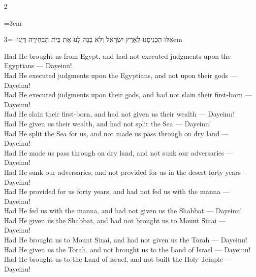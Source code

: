 \documentclass[11pt, openany]{book}
\newenvironment{bilingual}{%
  \par\vspace{4pt}%
  \begin{paracol}{2}%
}{%
  \end{paracol}%
  \par\vspace{2pt}%
}
\newenvironment{hebrewcol}{%
  \switchcolumn[1]%
  \begingroup
  \RTL
  \hebrewfont\large
  \setstretch{1.4}%
  \emergencystretch=3em
  \tolerance=9999
  \parindent=0pt\relax
}{%
  \endRTL
  \endgroup
}
\newenvironment{englishcol}{%
  \switchcolumn[0]%
  \begingroup
  \setstretch{1.4}%
  \emergencystretch=3em
  \tolerance=9999
  \normalsize
  \rightskip=0.12in\relax
}{%
  \endgroup
}
\begin{document}
\begin{bilingual}
\begin{hebrewcol}
אִלּוּ הִכְנִיסָנוּ לְאֶרֶץ יִשְׂרָאֵל וְלֹא בָנָה לָנוּ אֶת בֵּית הַבְּחִירָה			 דַּיֵּנוּ:
\end{hebrewcol}
\begin{englishcol}
Had He brought us from Egypt, and had not executed judgments upon the Egyptians --- Dayeinu!\\
Had He executed judgments upon the Egyptians, and not upon their gods --- Dayeinu!\\
Had He executed judgments upon their gods, and had not slain their first-born --- Dayeinu!\\
Had He slain their first-born, and had not given us their wealth --- Dayeinu!\\
Had He given us their wealth, and had not split the Sea --- Dayeinu!\\
Had He split the Sea for us, and not made us pass through on dry land --- Dayeinu!\\
Had He made us pass through on dry land, and not sunk our adversaries --- Dayeinu!\\
Had He sunk our adversaries, and not provided for us in the desert forty years --- Dayeinu!\\
Had He provided for us forty years, and had not fed us with the manna --- Dayeinu!\\
Had He fed us with the manna, and had not given us the Shabbat --- Dayeinu!\\
Had He given us the Shabbat, and had not brought us to Mount Sinai --- Dayeinu!\\
Had He brought us to Mount Sinai, and had not given us the Torah --- Dayeinu!\\
Had He given us the Torah, and not brought us to the Land of Israel --- Dayeinu!\\
Had He brought us to the Land of Israel, and not built the Holy Temple --- Dayeinu!
\end{englishcol}
\end{bilingual}
\end{document}
